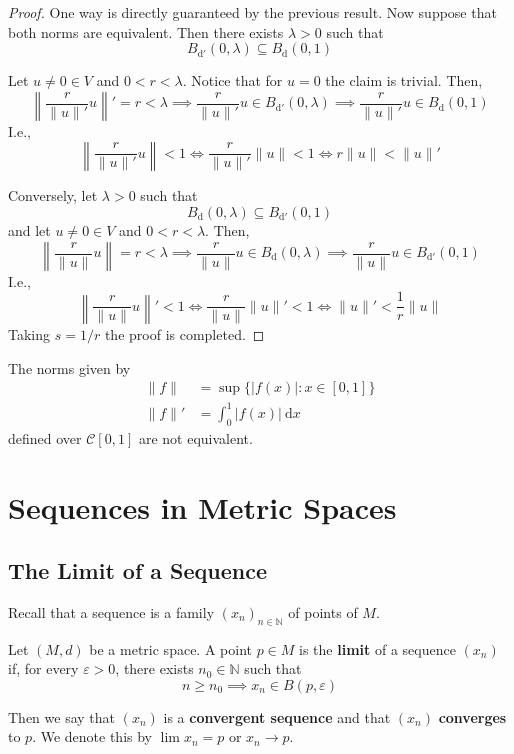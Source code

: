 \begin{proof}
	One way is directly guaranteed by the previous result. Now suppose that both norms are equivalent. Then there exists $\lambda > 0$ such that
	\[
		B_{\mathrm{d}'}(0, \lambda) \subseteq B_\mathrm{d}(0,1)
	\]
	
	Let $u \neq 0 \in V$ and $0 < r < \lambda$. Notice that for $u = 0$ the claim is trivial. Then,
	\[
		\left\| \frac{r}{\| u \|'} u \right\|' = r < \lambda \implies \frac{r}{\| u \|'} u \in B_{\mathrm{d}'}(0, \lambda) \implies \frac{r}{\| u \|'} u \in B_\mathrm{d}(0,1)
	\]
	I.e., 
	\[
		\left\| \frac{r}{\| u \|'} u \right\| < 1 \iff \frac{r}{\| u \|'} \| u \| < 1 \iff r \| u \| < \| u \|'
	\]

	Conversely, let $\lambda > 0$ such that
	\[
		B_\mathrm{d}(0,\lambda) \subseteq B_{\mathrm{d}'}(0, 1)
	\]
	and let $u \neq 0 \in V$ and $0 < r < \lambda$. Then,
	\[
		\left\| \frac{r}{\| u \|} u \right\| = r < \lambda \implies \frac{r}{\| u \|} u \in B_{\mathrm{d}}(0, \lambda) \implies \frac{r}{\| u \|} u \in B_{\mathrm{d}'}(0,1)
	\]
	I.e.,
	\[
		\left\| \frac{r}{\| u \|} u \right\|' < 1 \iff \frac{r}{\| u \|} \| u \|' < 1 \iff \| u \|' < \frac{1}{r} \| u \|
	\]
	Taking $s = 1/r$ the proof is completed.
\end{proof}

\begin{example}
	The norms given by 
	\begin{equation*}
		\begin{aligned}
			\| f \|  &= \sup \{ |f(x)| : x \in [0,1] \} \\
			\| f \|' &= \int_0^1 |f(x)| ~\mathrm{d}x
		\end{aligned}
	\end{equation*}
	defined over $\mathcal{C}[0,1]$ are not equivalent.
\end{example}

\section{Sequences in Metric Spaces}

\subsection{The Limit of a Sequence}

Recall that a sequence is a family $(x_n)_{n \in \mathbb{N}}$ of points of $M$.

\begin{definition}
	Let $(M,d)$ be a metric space. A point $p \in M$ is the \textbf{limit} of a sequence $(x_n)$ if, for every $\varepsilon > 0$, there exists $n_0 \in \mathbb{N}$ such that
	\[
		n \geq n_0 \implies x_n \in B(p, \varepsilon)
	\]

	Then we say that $(x_n)$ is a \textbf{convergent sequence} and that $(x_n)$ \textbf{converges} to $p$. We denote this by $\lim x_n = p$ or $x_n \longrightarrow p$. 
\end{definition}

